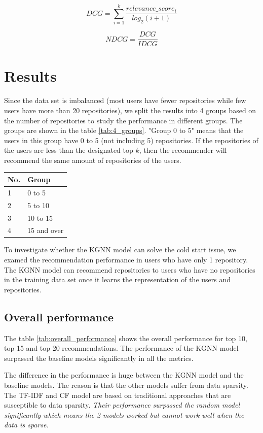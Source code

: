 \documentclass[11pt,twoside]{report}
\begin{document}
\begin{equation}
    DCG=\sum_{i=1}^k\frac{relevance\_score_i}{log_2(i+1)}
    \label{eq:dcg}
\end{equation}

\begin{equation}
    NDCG=\frac{DCG}{IDCG}
    \label{eq:ndcg}
\end{equation}

\section{Results}
Since the data set is imbalanced (most users have fewer repositories while few users have more than 20 repositories), we split the results into 4 groups based on the number of repositories to study the performance in different groups. The groups are shown in the table \ref{tab:4_groups}. "Group 0 to 5" means that the users in this group have 0 to 5 (not including 5) repositories. If the repositories of the users are less than the designated top $k$, then the recommender will recommend the same amount of repositories of the users.

\begin{center}
    \begin{tabular}{l | l}
    \hline
    No. & Group \\
    \hline
    1 & 0 to 5 \\
    2 & 5 to 10 \\
    3 & 10 to 15 \\
    4 & 15 and over
    \end{tabular}
    \label{tab:4_groups}
\end{center}

To investigate whether the KGNN model can solve the cold start issue, we examed the recommendation performance in users who have only 1 repository. The KGNN model can recommend repositories to users who have no repositories in the training data set once it learns the representation of the users and repositories.

\subsection{Overall performance}
The table \ref{tab:overall_performance} shows the overall performance for top 10, top 15 and top 20 recommendations. The performance of the KGNN model surpassed the baseline models significantly in all the metrics.

The difference in the performance is huge between the KGNN model and the baseline models. The reason is that the other models suffer from data sparsity. The TF-IDF and CF model are based on traditional approaches that are susceptible to data sparsity. \textit{Their performance surpassed the random model significantly which means the 2 models worked but cannot work well when the data is sparse.}
\end{document}
